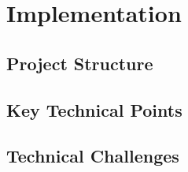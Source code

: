 \section{Implementation}
\label{sec:implementation}

\subsection{Project Structure}

\subsection{Key Technical Points}


\subsection{Technical Challenges}
